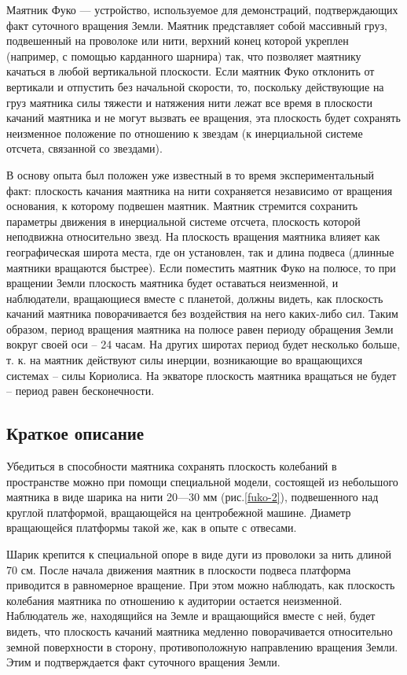 \documentclass[All.tex]{subfiles}
\begin{document}
Маятник Фуко — устройство, используемое для демонстраций, подтверждающих факт суточного вращения Земли.
Маятник представляет собой массивный груз, подвешенный на проволоке или нити, верхний конец которой укреплен (например, с помощью карданного шарнира) так, что позволяет маятнику качаться в любой вертикальной плоскости. 
Если маятник Фуко отклонить от вертикали и отпустить без начальной скорости, то, 
			поскольку действующие на груз маятника силы тяжести и натяжения нити лежат все время в плоскости качаний маятника и не могут вызвать ее вращения, эта плоскость будет сохранять неизменное положение
			по отношению к звездам (к инерциальной системе отсчета, связанной со звездами). 
			
В основу опыта был положен уже известный в то время экспериментальный факт: 
плоскость качания маятника на нити сохраняется независимо от вращения основания, к которому подвешен маятник. 
Маятник стремится сохранить параметры движения в инерциальной системе отсчета, плоскость которой неподвижна относительно звезд. 
На плоскость вращения маятника влияет как географическая широта места, где он установлен, так и длина подвеса (длинные маятники вращаются быстрее).	
Если поместить маятник Фуко на полюсе, то при вращении Земли плоскость маятника будет 
оставаться неизменной, и наблюдатели, вращающиеся вместе с планетой, должны видеть, 
как плоскость качаний маятника поворачивается без воздействия на него каких-либо сил. 
Таким образом, период вращения маятника на полюсе равен периоду обращения Земли вокруг своей оси – 24 часам. 
На других широтах период будет несколько больше, т. к. на маятник действуют силы инерции, возникающие во вращающихся системах – силы Кориолиса. 
На экваторе плоскость маятника вращаться не будет – период равен бесконечности.

	\subsection*{\textcolor{PineGreen}{Краткое описание}}
	
	Убедиться в способности маятника сохранять плоскость колебаний в пространстве можно при помощи специальной модели, состоящей из небольшого маятника в виде шарика на нити 20—30 мм (рис.\ref{fuko-2}), подвешенного над круглой платформой, вращающейся на центробежной машине.
	Диаметр вращающейся платформы такой же, как в опыте с отвесами. %
	

	Шарик крепится к специальной опоре в виде дуги из проволоки за нить длиной 70 см.
	После начала движения маятник в плоскости подвеса платформа приводится в равномерное вращение.
	При этом можно наблюдать, как плоскость колебания маятника по отношению к аудитории остается неизменной.
	Наблюдатель же, находящийся на Земле и вращающийся вместе с ней, 
	будет видеть, что плоскость качаний маятника медленно поворачивается относительно земной 
	поверхности в сторону, противоположную направлению вращения Земли.
	Этим и подтверждается факт суточного вращения Земли.
		
\end{document}
